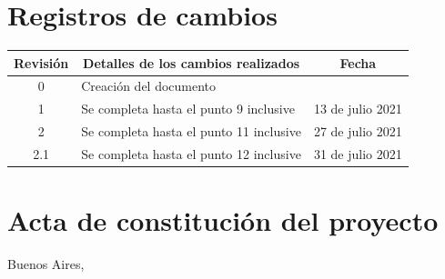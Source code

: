 \documentclass[
11pt, %
codirector, %
]{charter}
\begin{document}
\maketitle
\thispagestyle{empty}
\pagebreak


\thispagestyle{empty}
{\setlength{\parskip}{0pt}
	\tableofcontents{}
}
\pagebreak


\section*{Registros de cambios}
\label{sec:registro}


\begin{table}[ht]
	\label{tab:registro}
	\centering
	\begin{tabularx}{\linewidth}{@{}|c|X|c|@{}}
		\hline
		\rowcolor[HTML]{C0C0C0}
		Revisión & \multicolumn{1}{c|}{\cellcolor[HTML]{C0C0C0}Detalles de los cambios realizados} & Fecha            \\ \hline
		0        & Creación del documento                                                          & \fechaInicioName \\ \hline
		1        & Se completa hasta el punto 9 inclusive                                          & 13 de julio 2021 \\ \hline
		2        & Se completa hasta el punto 11 inclusive                                         & 27 de julio 2021 \\ \hline
		2.1      & Se completa hasta el punto 12 inclusive                                         & 31 de julio 2021 \\ \hline
	\end{tabularx}
\end{table}

\pagebreak



\section*{Acta de constitución del proyecto}
\label{sec:acta}

\begin{flushright}
	Buenos Aires, \fechaInicioName
\end{flushright}
\end{document}
